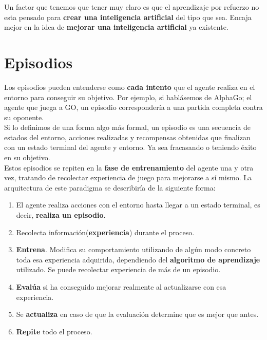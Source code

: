 \documentclass[11pt,fleqn]{book} %
\begin{document}
Un factor que tenemos que tener muy claro es que el aprendizaje por refuerzo no esta pensado para \textbf{crear una inteligencia artificial} del tipo que sea. Encaja mejor en la idea de \textbf{mejorar una inteligencia artificial} ya existente. \\

\section{Episodios}\label{sec:episodios}

Los episodios pueden entenderse como \textbf{cada intento} que el agente realiza en el entorno para conseguir su objetivo. Por ejemplo, si hablásemos de AlphaGo; el agente que juega a GO, un episodio correspondería a una partida completa contra su oponente. \\

Si lo definimos de una forma algo más formal, un episodio es una secuencia de estados del entorno, acciones realizadas y recompensas obtenidas que finalizan con un estado terminal del agente y entorno. Ya sea fracasando o teniendo éxito en su objetivo. \\

Estos episodios se repiten en la \textbf{fase de entrenamiento} del agente una y otra vez, tratando de recolectar experiencia de juego para mejorarse a sí mismo. La arquitectura de este paradigma se describiría de la siguiente forma: \\

\begin{enumerate}
	\item El agente realiza acciones con el entorno hasta llegar a un estado terminal, es decir, \textbf{realiza un episodio}. \\
	\item Recolecta información(\textbf{experiencia}) durante el proceso. \\
	\item \textbf{Entrena}. Modifica su comportamiento utilizando de algún modo concreto toda esa experiencia adquirida, dependiendo del \textbf{algoritmo de aprendizaje} utilizado. Se puede recolectar experiencia de más de un episodio. \\
	\item \textbf{Evalúa} si ha conseguido mejorar realmente al actualizarse con esa experiencia. \\
	\item Se \textbf{actualiza} en caso de que la evaluación determine que es mejor que antes. \\
	\item \textbf{Repite} todo el proceso. \\
\end{enumerate}
\end{document}
